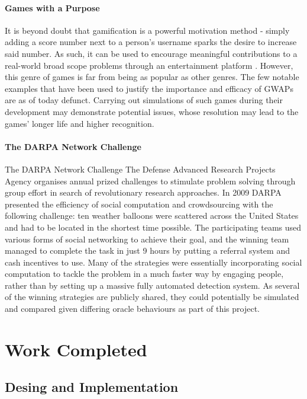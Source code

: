 \documentclass[12pt,a4,xcolor=table]{article}
\begin{document}
\paragraph{Games with a Purpose}
It is beyond doubt that gamification is a powerful motivation method - simply adding a score number next to a person's username sparks the desire to increase said number. As such, it can be used to encourage meaningful contributions to a real-world broad scope problems through an entertainment platform \cite{Ahn2006}. However, this genre of games is far from being as popular as other genres. The few notable examples that have been used to justify the importance and efficacy of GWAPs\cite{von2008designing} are as of today defunct. Carrying out simulations of such games during their development may demonstrate potential issues, whose resolution may lead to the games' longer life and higher recognition.

\paragraph{The DARPA Network Challenge}

The DARPA Network Challenge The Defense Advanced Research Projects Agency organises annual prized challenges to stimulate problem solving through group effort in search of revolutionary research approaches. In 2009 DARPA presented the efficiency of social computation and crowdsourcing with the following challenge: ten weather balloons were scattered across the United States and had to be located in the shortest time possible. The participating teams used various forms of social networking to achieve their goal, and the winning team managed to complete the task in just 9 hours by putting a referral system and cash incentives to use. Many of the strategies were essentially incorporating social computation to tackle the problem in a much faster way by engaging people, rather than by setting up a massive fully automated detection system\cite{Robertson2013}. As several of the winning strategies are publicly shared\cite{tang2011reflecting}, they could potentially be simulated and compared given differing oracle behaviours as part of this project.

\section{Work Completed}
\subsection{Desing and Implementation}
\end{document}
